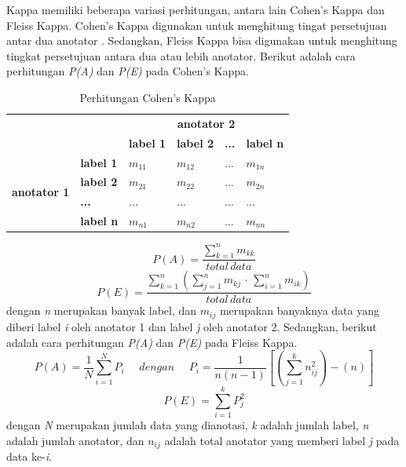 	Kappa memiliki beberapa variasi perhitungan, antara lain Cohen's Kappa dan Fleiss Kappa. Cohen's Kappa digunakan untuk menghitung tingat persetujuan antar dua anotator \citep{Cohen1960}. Sedangkan, Fleiss Kappa \citep{fleiss1971measuring} bisa digunakan untuk menghitung tingkat persetujuan antara dua atau lebih anotator.
	Berikut adalah cara perhitungan \textit{P(A)} dan \textit{P(E)} pada Cohen's Kappa.
	\begin{table}
		\centering
		\caption{Perhitungan Cohen's Kappa}
		\label{table:cohenKappa}
		\begin{tabular}{|l|l|l|l|l|l|}
			\hline
			\multicolumn{2}{|l|}{\multirow{2}{*}{}} & \multicolumn{4}{c|}{\textbf{anotator 2}} \\ \cline{3-6} 
			\multicolumn{2}{|l|}{} & \textbf{label 1} & \textbf{label 2} & \textbf{...} & \textbf{label n} \\ \hline
			\multirow{4}{*}{\textbf{anotator 1}} & \textbf{label 1} & $m_{11}$ & $m_{12}$ & ... & $m_{1n}$ \\ \cline{2-6} 
			& \textbf{label 2} & $m_{21}$ & $m_{22}$ & ... & $m_{2n}$ \\ \cline{2-6} 
			& \textbf{...} & ... & ... & ... & ... \\ \cline{2-6} 
			& \textbf{label n} & $m_{n1}$ & $m_{n2}$ & ... & $m_{nn}$ \\ \hline
		\end{tabular}
	\end{table}
	\begin{equation}
	P(A) =\frac{\sum_{k=1}^{n} m_{kk}}{total\, data}
	\end{equation} 
	\begin{equation}
	P(E) =\frac{\sum_{k=1}^{n}(\sum_{j=1}^{n} m_{kj}\, \cdot \,\sum_{i=1}^{n} m_{ik})}{total\, data}
	\end{equation}
	\noindent dengan \textit{n} merupakan banyak label, dan $m_{ij}$ merupakan banyaknya data yang diberi label \textit{i} oleh anotator 1 dan label \textit{j} oleh anotator 2. Sedangkan, berikut adalah cara perhitungan \textit{P(A)} dan \textit{P(E)} pada Fleiss Kappa.
	\begin{equation}
	P(A) = \frac{1}{N}\sum_{i=1}^{N}P_{i}\:\:\:\:\:\:
	dengan\:\:\:\:\:\: P_{i} = \frac{1}{n(n-1)}[(\sum_{j=1}^{k}n_{ij}^{2})-(n)]
	\end{equation} 
	\begin{equation}
	P(E) = \sum_{i=1}^{k}P_{j}^{2}
	\end{equation}
	dengan \textit{N} merupakan jumlah data yang dianotasi, \textit{k} adalah jumlah label, \textit{n} adalah jumlah anotator, dan $n_{ij}$ adalah total anotator yang memberi label \textit{j} pada data ke-\textit{i}.
